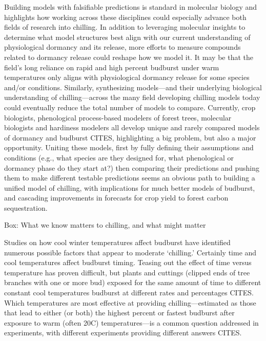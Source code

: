 \documentclass[11pt]{article}
\begin{document}
Building models with falsifiable predictions is standard in molecular biology and highlights how working across these disciplines could especially advance both fields of research into chilling. In addition to leveraging molecular insights to determine what model structures best align with our current understanding of physiological dormancy and its release, more efforts to measure compounds related to dormancy release could reshape how we model it. It may be that the field's long reliance on rapid and high percent budburst under warm temperatures only aligns with physiological dormancy release for some species and/or conditions. Similarly, synthesizing models---and their underlying biological understanding of chilling---across the many field developing chilling models today could eventually reduce the total number of models to compare. Currently, crop biologists, phenological process-based modelers of forest trees, molecular biologists and hardiness modelers all develop unique and rarely compared models of dormancy and budburst CITES, highlighting a big problem, but also a major opportunity. Uniting these models, first by fully defining their assumptions and conditions (e.g., what species are they designed for, what phenological or dormancy phase do they start at?) then comparing their predictions and pushing them to make different testable predictions seems an obvious path to building a unified model of chilling, with implications for much better models of budburst, and cascading improvements in forecasts for crop yield to forest carbon sequestration. 

{\sc Box: What we know matters to chilling, and what might matter} %

Studies on how cool winter temperatures affect budburst have identified numerous possible factors that appear to moderate `chilling.' Certainly time and cool temperatures affect budburst timing. Teasing out the effect of time versus temperature has proven difficult, but plants and cuttings (clipped ends of tree branches with one or more bud) exposed for the same amount of time to different constant cool temperatures budburst at different rates and percentages CITES. Which temperatures are most effective at providing chilling---estimated as those that lead to either (or both) the highest percent or fastest budburst after exposure to warm (often 20\degree C) temperatures---is a common question addressed in experiments, with different experiments providing different answers CITES. 
\end{document}
